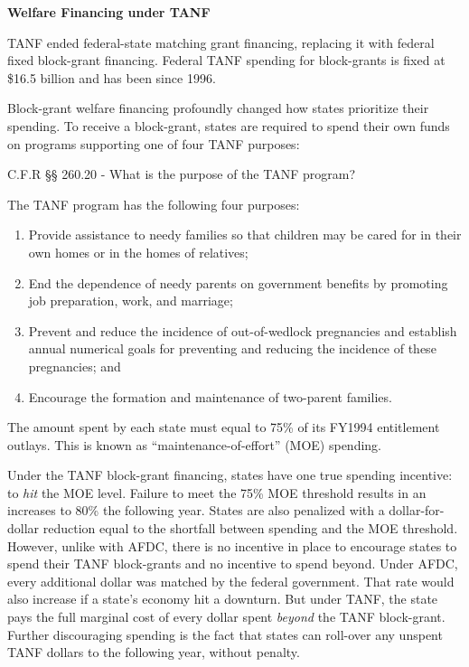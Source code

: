 \documentclass[12pt,letterpaperpaper,]{book}
\renewenvironment{quote}{\begin{VF}}{\end{VF}}
\begin{document}
\textbf{Welfare Financing under TANF}

TANF ended federal-state matching grant financing, replacing it with
federal fixed block-grant financing. Federal TANF spending for
block-grants is fixed at \$16.5 billion and has been since 1996.

Block-grant welfare financing profoundly changed how states prioritize
their spending. To receive a block-grant, states are required to spend
their own funds on programs supporting one of four TANF purposes:

\begin{quote}
C.F.R §§ 260.20 - What is the purpose of the TANF program?

The TANF program has the following four purposes:

\begin{enumerate}
\def\labelenumi{(\alph{enumi})}
\item
  Provide assistance to needy families so that children may be cared for
  in their own homes or in the homes of relatives;
\item
  End the dependence of needy parents on government benefits by
  promoting job preparation, work, and marriage;
\item
  Prevent and reduce the incidence of out-of-wedlock pregnancies and
  establish annual numerical goals for preventing and reducing the
  incidence of these pregnancies; and
\item
  Encourage the formation and maintenance of two-parent families.
\end{enumerate}
\end{quote}

The amount spent by each state must equal to 75\% of its FY1994
entitlement outlays. This is known as ``maintenance-of-effort'' (MOE)
spending.

Under the TANF block-grant financing, states have one true spending
incentive: to \emph{hit} the MOE level. Failure to meet the 75\% MOE
threshold results in an increases to 80\% the following year. States are
also penalized with a dollar-for-dollar reduction equal to the shortfall
between spending and the MOE threshold. However, unlike with AFDC, there
is no incentive in place to encourage states to spend their TANF
block-grants and no incentive to spend beyond. Under AFDC, every
additional dollar was matched by the federal government. That rate would
also increase if a state's economy hit a downturn. But under TANF, the
state pays the full marginal cost of every dollar spent \emph{beyond}
the TANF block-grant. Further discouraging spending is the fact that
states can roll-over any unspent TANF dollars to the following year,
without penalty.
\end{document}
